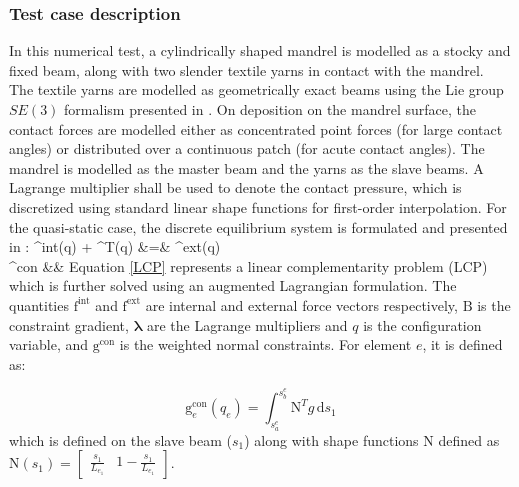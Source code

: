 \subsubsection{Test case description}
In this numerical test, a cylindrically shaped mandrel is modelled as a stocky and fixed beam, along with two slender textile yarns in contact with the mandrel.\\
The textile yarns are modelled as geometrically exact beams using the Lie group $SE(3)$ formalism presented in \cite{sonneville2014geometrically}. On deposition on the mandrel surface, the contact forces are modelled either as concentrated point forces (for large contact angles) or distributed over a continuous patch (for acute contact angles). The mandrel is modelled as the master beam and the yarns as the slave beams. A Lagrange multiplier shall be used to denote the contact pressure, which is discretized using standard linear shape functions for first-order interpolation. For the quasi-static case, the discrete equilibrium system is formulated and presented in \cite{bosten2022mortar}:
%
\bea\label{equilibrium}
^{\textrm{int}}(q) + ^{T}(q) \boldsymbol{\lambda} &=& ^{\textrm{ext}}(q)\\ %
 \leq \boldsymbol{\lambda} \perp {}^{\textrm{con}} &\geq&  \label{LCP}
\eea
%
Equation \ref{LCP} represents a linear complementarity problem (LCP) which is further solved using an augmented Lagrangian formulation. 
The quantities $\boldsymbol{\mathrm{f}}^{\textrm{int}}$ and $\boldsymbol{\mathrm{f}}^{\textrm{ext}}$ are internal and external force vectors respectively, $\boldsymbol{\mathrm{B}}$ is the constraint gradient, $\boldsymbol{\lambda}$ are the Lagrange multipliers and $q$ is the configuration variable, and $\boldsymbol{\mathrm{g}}^{\textrm{con}}$ is the weighted normal constraints. For element $e$, it is defined as: 

\begin{equation}
    \boldsymbol{\mathrm{g}}_e^{\textrm{con}}(q_e) = \int_{s^e_{a}}^{s^e_{b}} \boldsymbol{\mathrm{N}}^{T} g \, \mathrm{d}s_1
\end{equation}
which is defined on the slave beam ($s_1$) along with shape functions $\boldsymbol{\mathrm{N}}$ defined as $\boldsymbol{\mathrm{N}} (s_1) = \begin{bmatrix}
\frac{s_1}{L_{e_1}} & 1 - \frac{s_1}{L_{e_1}} 
\end{bmatrix}$. 

